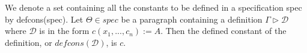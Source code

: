 \begin{defin} We denote a set containing all the constants to be defined in a
specification spec by defcons(spec). Let $\Theta \in spec$ be a paragraph
containing a definition $\Gamma \triangleright \mathcal{D}$ where $\mathcal{D}$
is in the form $c(x_{1},...,c_{n}):=A$. Then the defined constant of the
definition, or $defcons(\mathcal{D})$, is $c$.
\end{defin}


